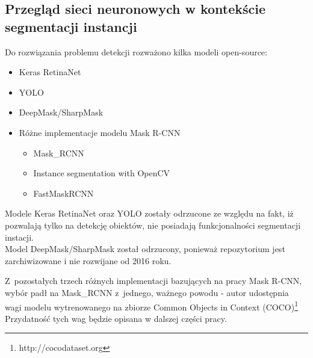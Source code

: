 \subsection{Przegląd sieci neuronowych w kontekście segmentacji instancji}

Do rozwiązania problemu detekcji rozważono kilka modeli open-source:

\begin{itemize}
	\item Keras RetinaNet \cite{keras-retinanet}
	\item YOLO \cite{yolo}
	\item DeepMask/SharpMask \cite{deep-sharp-mask}
	\item Różne implementacje modelu Mask R-CNN \cite{general-mask-rcnn}
		\begin{itemize}
			\item Mask\_RCNN \cite{matterport-mask-rcnn}
			\item Instance segmentation with OpenCV \cite{mask-rcnn-opencv}
			\item FastMaskRCNN \cite{fast-mask-rcnn}
		\end{itemize}
\end{itemize}

Modele Keras RetinaNet oraz YOLO zostały odrzucone ze względu na fakt, iż pozwalają tylko na detekcję obiektów, nie posiadają funkcjonalności segmentacji instacji. \\

Model DeepMask/SharpMask został odrzucony, ponieważ repozytorium jest zarchiwizowane i nie rozwijane od 2016 roku.

Z~pozostałych trzech różnych implementacji bazujących na pracy Mask R-CNN, wybór padł na Mask\_RCNN z~jednego, ważnego powodu - autor udostępnia wagi modelu wytrenowanego na zbiorze Common Objects in Context (COCO)\footnote{http://cocodataset.org} Przydatność tych wag będzie opisana w dalszej części pracy.
